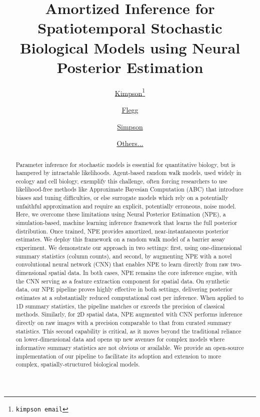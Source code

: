 \documentclass{article}
\title{Amortized Inference for Spatiotemporal Stochastic Biological Models using Neural Posterior Estimation}
\author[1]{%
	\href{https://orcid.org/0000-0000-0000-0000}{\usebox{\orcid}\hspace{1mm}Kimpson\thanks{\texttt{kimpson email}}}%
}
\author[1]{%
	\href{https://orcid.org/0000-0000-0000-0000}{\usebox{\orcid}\hspace{1mm}Flegg}}
\author[2]{%
	\href{https://orcid.org/0000-0000-0000-0000}{\usebox{\orcid}\hspace{1mm}Simpson}}
\author[2]{%
	\href{https://orcid.org/0000-0000-0000-0000}{\usebox{\orcid}\hspace{1mm}Others...}}
\affil[1]{Unimelb, etc}
\affil[2]{QUT, etc}
\begin{document}
\maketitle





\begin{abstract}
Parameter inference for stochastic models is essential for quantitative biology, but is hampered by intractable likelihoods. Agent-based random walk models, used widely in ecology and cell biology, exemplify this challenge, often forcing researchers to use likelihood-free methods like Approximate Bayesian Computation (ABC) that introduce biases and tuning difficulties, or else surrogate models which rely on a potentially unfaithful approximation and require an explicit, potentially erroneous, noise model. Here, we overcome these limitations using Neural Posterior Estimation (NPE), a simulation-based, machine learning inference framework that learns the full posterior distribution. Once trained, NPE provides amortized, near-instantaneous posterior estimates. We deploy this framework on a random walk model of a barrier assay experiment. We demonstrate our approach in two settings: first, using one-dimensional summary statistics (column counts), and second, by augmenting NPE with a novel convolutional neural network (CNN) that enables NPE to learn directly from raw two-dimensional spatial data. In both cases, NPE remains the core inference engine, with the CNN serving as a feature extraction component for spatial data. On synthetic data, our NPE pipeline proves highly effective in both settings, delivering posterior estimates at a substantially reduced computational cost per inference. When applied to 1D summary statistics, the pipeline matches or exceeds the precision of classical methods. Similarly, for 2D spatial data, NPE augmented with CNN performs inference directly on raw images with a precision comparable to that from curated summary statistics. This second capability is critical, as it moves beyond the traditional reliance on lower-dimensional data and opens up new avenues for complex models where informative summary statistics are not obvious or available. We provide an open-source implementation of our pipeline to facilitate its adoption and extension to more complex, spatially-structured biological models.
\end{abstract}


\end{document}
